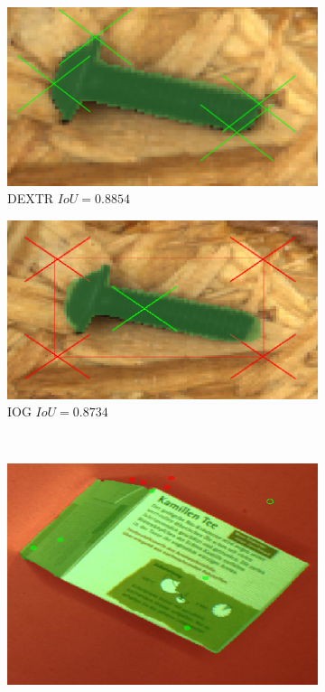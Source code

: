 \begin{figure}
\begin{subfigure}[t]{0.3\textwidth}
{		}
	\end{subfigure}
	\hfill
	\begin{subfigure}[t]{0.3\textwidth}
		\centering
		\includegraphics[width=\textwidth]{figures/appendix/method_predictions/screw57_dextr.png}
		\caption{
			DEXTR $ IoU = 0.8854 $
		}
	\end{subfigure}
	\hfill
	\begin{subfigure}[t]{0.3\textwidth}
		\centering
		\includegraphics[width=\textwidth]{figures/appendix/method_predictions/screw57_iog.png}
		\caption{
			IOG $ IoU = 0.8734 $
		}
	\end{subfigure}
	\\
	\begin{subfigure}[t]{0.3\textwidth}
		\centering
		\includegraphics[width=\textwidth]{figures/appendix/method_predictions/tea17_watershed.png}

\end{subfigure}
\end{figure}
